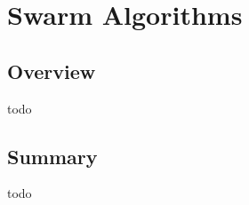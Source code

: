 


\chapter{Swarm Algorithms}
\label{ch:swarm}

\section{Overview}
todo



\newpage
\newpage
\newpage
\newpage
\newpage
\newpage
\newpage
\newpage
\newpage
\newpage
\newpage

\section{Summary}
todo
